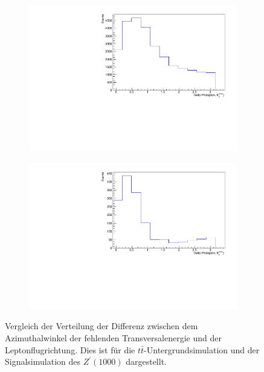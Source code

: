 \begin{figure}
  \begin{subfigure}{0.5\textwidth}
    \centering
    \includegraphics[width=\linewidth]{plots_and_txt/ttbar.mu_selected_/ttbar.mu_selected_DeltaPhi.pdf}
    \caption{}
    \label{fig:ttbar_sys1}
  \end{subfigure}%
  \begin{subfigure}{0.5\textwidth}
    \centering
    \includegraphics[width=\linewidth]{plots_and_txt/zprime1000.mu_selected_/zprime1000.mu_selected_DeltaPhi.pdf}
    \caption{}
    \label{fig:zprime_sys1}
  \end{subfigure}%
  \caption{Vergleich der Verteilung der Differenz zwischen dem Azimuthalwinkel der fehlenden Transversalenergie und der Leptonflugrichtung.
  Dies ist für die $t\bar{t}$-Untergrundsimulation  und der Signalsimulation des $Z^\prime(1000)$  dargestellt.
  }
  \label{fig:Comparison1}
\end{figure}

